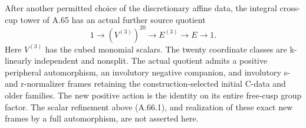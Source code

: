 After another permitted choice of the discretionary affine data, the
integral cross-cup tower of A.65 has an actual further source quotient
\[
 1\longrightarrow (V^{(3)})^{20}\longrightarrow E^{(3)}
 \longrightarrow E\longrightarrow1.
 \tag{A.66.1}
\]
Here \(V^{(3)}\) has the cubed monomial scalars. The twenty coordinate
classes are k-linearly independent and nonsplit. The actual quotient
admits a positive peripheral automorphism, an involutory negative
companion, and involutory s- and r-normalizer frames retaining the
construction-selected initial C-data and older families. The new
positive action is the identity on its entire free-cusp group factor.
The scalar refinement above (A.66.1), and realization of these exact
new frames by a full automorphism, are not asserted here.

